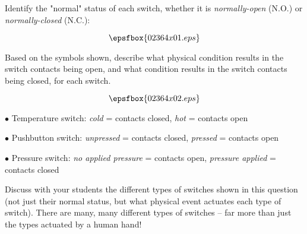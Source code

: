 

Identify the "normal" status of each switch, whether it is {\it normally-open} (N.O.) or {\it normally-closed} (N.C.):

$$\epsfbox{02364x01.eps}$$

Based on the symbols shown, describe what physical condition results in the switch contacts being open, and what condition results in the switch contacts being closed, for each switch.







$$\epsfbox{02364x02.eps}$$

\medskip
\item{$\bullet$} Temperature switch: {\it cold} = contacts closed, {\it hot} = contacts open
\item{$\bullet$} Pushbutton switch: {\it unpressed} = contacts closed, {\it pressed} = contacts open
\item{$\bullet$} Pressure switch: {\it no applied pressure} = contacts open, {\it pressure applied} = contacts closed
\medskip







Discuss with your students the different types of switches shown in this question (not just their normal status, but what physical event actuates each type of switch).  There are many, many different types of switches -- far more than just the types actuated by a human hand!




